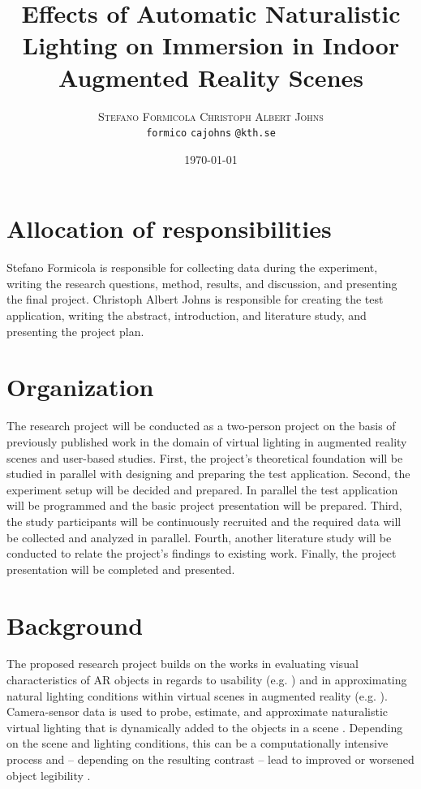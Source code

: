 \documentclass[12pt,twoside,english]{article}
\title{Effects of Automatic Naturalistic Lighting on Immersion in Indoor Augmented Reality Scenes}
\author{
        \textsc{Stefano Formicola}
            \qquad
        \textsc{Christoph Albert Johns}
        \mbox{}\\
        \normalsize
            \texttt{formico}
        \textbar{}
            \texttt{cajohns}
        \normalsize
            \texttt{@kth.se}
}
\date{\today}
\begin{document}
\maketitle






\section{Allocation of responsibilities}
\label{sect:alloc_responsibilities}

Stefano Formicola is responsible for collecting data during the experiment, writing the research questions, method, results, and discussion, and presenting the final project.
Christoph Albert Johns is responsible for creating the test application, writing the abstract, introduction, and literature study, and presenting the project plan.


\section{Organization}
\label{sect:organization}

The research project will be conducted as a two-person project on the basis of previously published work in the domain of virtual lighting in augmented reality scenes and user-based studies.
First, the project's theoretical foundation will be studied in parallel with designing and preparing the test application.
Second, the experiment setup will be decided and prepared. In parallel the test application will be programmed and the basic project presentation will be prepared.
Third, the study participants will be continuously recruited and the required data will be collected and analyzed in parallel.
Fourth, another literature study will be conducted to relate the project's findings to existing work.
Finally, the project presentation will be completed and presented.


\section{Background}
\label{sect:background}
The proposed research project builds on the works in evaluating visual characteristics of AR objects in regards to usability (e.g. \cite{gabbard_effects_2006}) and in approximating natural lighting conditions within virtual scenes in augmented reality (e.g. \cite{aittala_inverse_2010}).
Camera-sensor data is used to probe, estimate, and approximate naturalistic virtual lighting that is dynamically added to the objects in a scene \cite{apple_arlightestimate_nodate}.
Depending on the scene and lighting conditions, this can be a computationally intensive process \cite{steed_constructing_2016} and -- depending on the resulting contrast -- lead to improved or worsened object legibility \cite{gabbard_effects_2006}.
\end{document}
